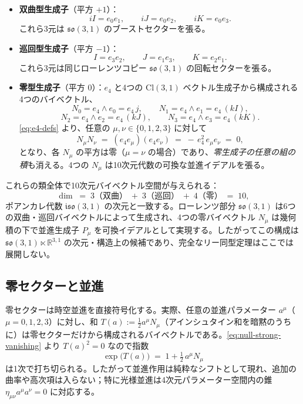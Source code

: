 \documentclass[dvipdfmx,11pt,a4paper]{article}
\theoremstyle{definition}
\theoremstyle{plain}
\theoremstyle{remark}
\begin{document}
\begin{itemize}
  \item \textbf{双曲型生成子}（平方 $+1$）：
  \[
  iI = e_{0}e_{1},\qquad iJ = e_{0}e_{2},\qquad iK = e_{0}e_{3}.
  \]
  これら3元は $\mathfrak{so}(3,1)$ のブーストセクターを張る。

  \item \textbf{巡回型生成子}（平方 $-1$）：
  \[
  I = e_{3}e_{2},\qquad J = e_{1}e_{3},\qquad K = e_{2}e_{1}.
  \]
  これら3元は同じローレンツコピー $\mathfrak{so}(3,1)$ の回転セクターを張る。

  \item \textbf{零型生成子}（平方 $0$）：$e_{4}$ と4つの $\mathrm{Cl}(3,1)$ ベクトル生成子から構成される4つのバイベクトル、
  \[
  N_{0} = e_{4}\wedge e_{0} = e_{4}\,j,\qquad
  N_{1} = e_{4}\wedge e_{1} = e_{4}\,(kI),
  \]
  \[
  N_{2} = e_{4}\wedge e_{2} = e_{4}\,(kJ),\qquad
  N_{3} = e_{4}\wedge e_{3} = e_{4}\,(kK).
  \]
  \eqref{eq:e4-defs} より、任意の $\mu,\nu\in\{0,1,2,3\}$ に対して
  \begin{equation}
  N_{\mu}N_{\nu} \;=\; (e_{4}e_{\mu})(e_{4}e_{\nu}) \;=\; -\,e_{4}^{2}\,e_{\mu}e_{\nu} \;=\; 0,
  \label{eq:null-strong-vanishing}
  \end{equation}
  となり、各 $N_{\mu}$ の平方は零（$\mu=\nu$ の場合）であり、\emph{零生成子の任意の組の積}も消える。4つの $N_{\mu}$ は10次元代数の可換な並進イデアルを張る。
\end{itemize}

これらの類全体で10次元バイベクトル空間が与えられる：
\[
\dim \;=\; 3 \text{（双曲）} \;+\; 3 \text{（巡回）} \;+\; 4 \text{（零）} \;=\; 10,
\]
ポアンカレ代数 $\mathfrak{iso}(3,1)$ の次元と一致する。ローレンツ部分 $\mathfrak{so}(3,1)$ は6つの双曲・巡回バイベクトルによって生成され、4つの零バイベクトル $N_{\mu}$ は幾何積の下で並進生成子 $P_{\mu}$ を可換イデアルとして実現する。したがってこの構成は $\mathfrak{so}(3,1)\ltimes\mathbb{R}^{3,1}$ の次元・構造上の候補であり、完全なリー同型定理はここでは展開しない。

\subsection{零セクターと並進}

零セクターは時空並進を直接符号化する。実際、任意の並進パラメーター $a^{\mu}$（$\mu=0,1,2,3$）に対し、和 $T(a):=\tfrac{1}{2}a^{\mu}N_{\mu}$（アインシュタイン和を暗黙のうちに）は零セクターだけから構成されるバイベクトルである。\eqref{eq:null-strong-vanishing} より $T(a)^{2}=0$ なので指数
\[
\exp\bigl(T(a)\bigr) \;=\; 1 + \tfrac{1}{2}\,a^{\mu}N_{\mu}
\]
は1次で打ち切られる。したがって並進作用は純粋なシフトとして現れ、追加の曲率や高次項は入らない；特に光様並進は4次元パラメーター空間内の錐 $\eta_{\mu\nu}a^{\mu}a^{\nu}=0$ に対応する。
\end{document}
